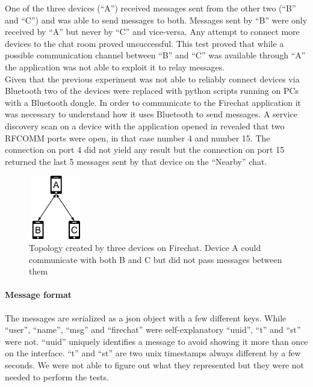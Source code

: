 One of the three devices (``A'') received messages sent from the other two (``B'' and ``C'') and was able to send messages to both.
Messages sent by ``B'' were only received by ``A'' but never by ``C'' and vice-versa.
Any attempt to connect more devices to the chat room proved unsuccessful.
This test proved that while a possible communication channel between ``B'' and ``C'' was available through ``A'' the application was not able to exploit it to relay messages.\\

Given that the previous experiment was not able to reliably connect devices via Bluetooth two of the devices were replaced with python scripts running on PCs with a Bluetooth dongle.
In order to communicate to the Firechat application it was necessary to understand how it uses Bluetooth to send messages.
A service discovery scan on a device with the application opened in revealed that two RFCOMM ports were open, in that case number 4 and number 15.
The connection on port 4 did not yield any result but the connection on port 15 returned the last 5 messages sent by that device on the ``Nearby'' chat.

\begin{figure}[ht!]
  \centering
  \includegraphics[width=0.2\textwidth]{img/diagram1.png} 
  \caption{Topology created by three devices on Firechat. Device A could communicate with both B and C but did not pass messages between them}
\end{figure}

\paragraph{Message format}
The messages are serialized as a json object with a few different keys.
While ``user'', ``name'', ``msg'' and ``firechat'' were self-explanatory ``uuid'', ``t'' and ``st'' were not.
``uuid'' uniquely identifies a message to avoid showing it more than once on the interface.
``t'' and ``st'' are two unix timestamps always different by a few seconds.
We were not able to figure out what they represented but they were not needed to perform the tests. 


